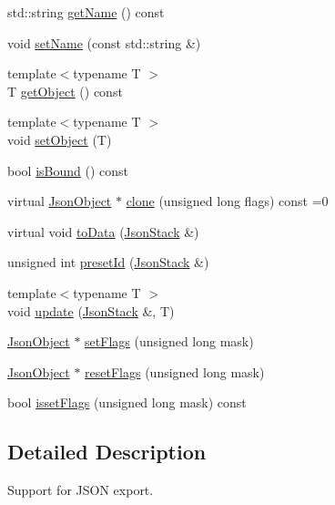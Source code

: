 \begin{DoxyCompactItemize}
\item 
std\+::string \hyperlink{classHurricane_1_1JsonObject_aa4d6d0502f0f25e614ef50ac3dd76263}{get\+Name} () const
\item 
void \hyperlink{classHurricane_1_1JsonObject_aeda98a478720cf29e532e2a11f6f54c5}{set\+Name} (const std\+::string \&)
\item 
{\footnotesize template$<$typename T $>$ }\\T \hyperlink{classHurricane_1_1JsonObject_ab1a1aaaa583d5c8f7adbc9c9d0eeeebf}{get\+Object} () const
\item 
{\footnotesize template$<$typename T $>$ }\\void \hyperlink{classHurricane_1_1JsonObject_aa8e23d2445b90cced19a97d50372314c}{set\+Object} (T)
\item 
bool \hyperlink{classHurricane_1_1JsonObject_a4bb80844dcd175ad16cf92ee29064850}{is\+Bound} () const
\item 
virtual \hyperlink{classHurricane_1_1JsonObject}{Json\+Object} $\ast$ \hyperlink{classHurricane_1_1JsonObject_a939cfbae43f7b0d994648d07bdba2b32}{clone} (unsigned long flags) const =0
\item 
virtual void \hyperlink{classHurricane_1_1JsonObject_a57a845ca64ac8912b35c4dbf75723af6}{to\+Data} (\hyperlink{classHurricane_1_1JsonStack}{Json\+Stack} \&)
\item 
unsigned int \hyperlink{classHurricane_1_1JsonObject_a3819d0c96ee99277e4cc8d349dc4155c}{preset\+Id} (\hyperlink{classHurricane_1_1JsonStack}{Json\+Stack} \&)
\item 
{\footnotesize template$<$typename T $>$ }\\void \hyperlink{classHurricane_1_1JsonObject_ace589494452d9d797506286613642cd4}{update} (\hyperlink{classHurricane_1_1JsonStack}{Json\+Stack} \&, T)
\item 
\hyperlink{classHurricane_1_1JsonObject}{Json\+Object} $\ast$ \hyperlink{classHurricane_1_1JsonObject_a5216e5f5d74f8dbf8665eef8a78b2fe1}{set\+Flags} (unsigned long mask)
\item 
\hyperlink{classHurricane_1_1JsonObject}{Json\+Object} $\ast$ \hyperlink{classHurricane_1_1JsonObject_a8346b1c958574275fe17f9c4cb40ee8b}{reset\+Flags} (unsigned long mask)
\item 
bool \hyperlink{classHurricane_1_1JsonObject_a267c55a1989a9907e25632d820681779}{isset\+Flags} (unsigned long mask) const
\end{DoxyCompactItemize}


\subsection{Detailed Description}
Support for J\+S\+ON export. 

